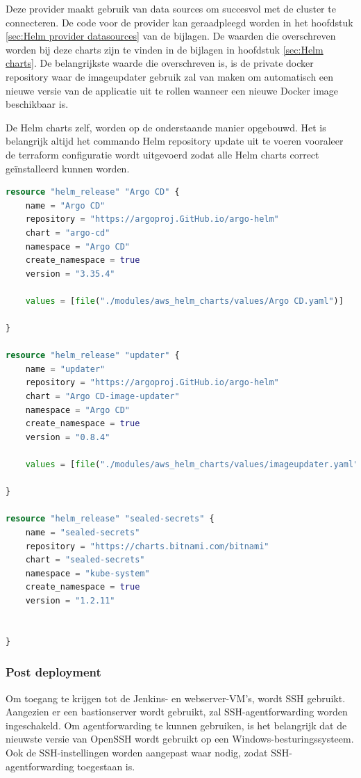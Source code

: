 Deze provider maakt gebruik van data sources om succesvol met de cluster te connecteren. De code voor de provider kan geraadpleegd worden in het hoofdstuk \ref{sec:Helm provider datasources} van de bijlagen. De waarden die overschreven worden bij deze charts zijn te vinden in de bijlagen in hoofdstuk \ref{sec:Helm charts}. De belangrijkste waarde die overschreven is, is de private docker repository waar de imageupdater gebruik zal van maken om automatisch een nieuwe versie van de applicatie uit te rollen wanneer een nieuwe Docker image beschikbaar is.
\clearpage

De Helm charts zelf, worden op de onderstaande manier opgebouwd. Het is belangrijk altijd het commando Helm repository update uit te voeren vooraleer de terraform configuratie wordt uitgevoerd zodat alle Helm charts correct geïnstalleerd kunnen worden.
\newline

\begin{lstlisting}[language=terraform]
  resource "helm_release" "Argo CD" {
    name = "Argo CD"
    repository = "https://argoproj.GitHub.io/argo-helm"
    chart = "argo-cd"
    namespace = "Argo CD" 
    create_namespace = true
    version = "3.35.4"

    values = [file("./modules/aws_helm_charts/values/Argo CD.yaml")]
  
}

resource "helm_release" "updater" {
    name = "updater"
    repository = "https://argoproj.GitHub.io/argo-helm"
    chart = "Argo CD-image-updater"
    namespace = "Argo CD" 
    create_namespace = true
    version = "0.8.4"

    values = [file("./modules/aws_helm_charts/values/imageupdater.yaml")]
  
}

resource "helm_release" "sealed-secrets" {
    name = "sealed-secrets"
    repository = "https://charts.bitnami.com/bitnami"
    chart = "sealed-secrets"
    namespace = "kube-system" 
    create_namespace = true
    version = "1.2.11"

  
}
\end{lstlisting}

\subsubsection{
{Post deployment}}
\label{sec:Post deployment}

Om toegang te krijgen tot de Jenkins- en webserver-VM's, wordt SSH gebruikt. Aangezien er een bastionserver wordt gebruikt, zal SSH-agentforwarding worden ingeschakeld. Om agentforwarding te kunnen gebruiken, is het belangrijk dat de nieuwste versie van OpenSSH wordt gebruikt op een Windows-besturingssysteem. Ook de SSH-instellingen worden aangepast waar nodig, zodat SSH-agentforwarding toegestaan is.
\newline

